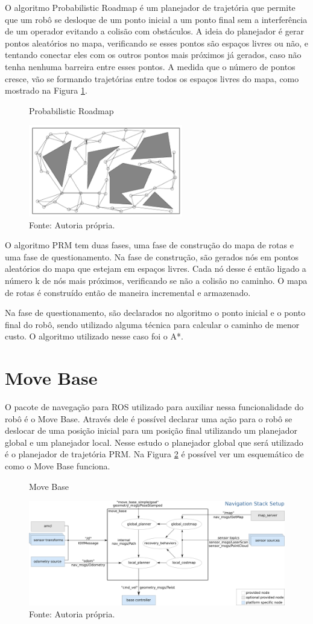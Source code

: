 O algoritmo Probabilistic Roadmap é um planejador de trajetória que permite que um robô se desloque de um ponto inicial a um ponto final sem a interferência de um operador evitando a colisão com obstáculos. A ideia do planejador é gerar pontos aleatórios no mapa, verificando se esses pontos são espaços livres ou não, e tentando conectar eles com os outros pontos mais próximos já gerados, caso não tenha nenhuma barreira entre esses pontos. A medida que o número de pontos cresce, vão se formando trajetórias entre todos os espaços livres do mapa, como mostrado na Figura \ref{fig:prm}. 



\begin{figure} [h!]	
   \centering
   \caption{Probabilistic Roadmap}
   \includegraphics[width=0.6\textwidth]{Figures/images.png}
   \caption*{Fonte: Autoria própria.}
   \label{fig:prm}
\end{figure}

O algoritmo PRM tem duas fases, uma fase de construção do mapa de rotas e uma fase de questionamento. Na fase de construção, são gerados nós em pontos aleatórios do mapa que estejam em espaços livres. Cada nó desse é então ligado a número k de nós mais próximos, verificando se não a colisão no caminho. O mapa de rotas é construído então de maneira incremental e armazenado.

Na fase de questionamento, são declarados no algoritmo o ponto inicial e o ponto final do robô, sendo utilizado alguma técnica para calcular o caminho de menor custo. O algoritmo utilizado nesse caso foi o A*.

\section{Move Base}

O pacote de navegação para ROS utilizado para auxiliar nessa funcionalidade do robô é o Move Base. Através dele é possível declarar uma ação para o robô se deslocar de uma posição inicial para um posição final utilizando um planejador global e um planejador local. Nesse estudo o planejador global que será utilizado é o planejador de trajetória PRM. Na Figura \ref{fig:move} é possível ver um esquemático de como o Move Base funciona.

\begin{figure} [h!]	
   \centering
   \caption{Move Base}
   \includegraphics[width=1\textwidth]{Figures/overview_tf.png}
   \caption*{Fonte: Autoria própria.}
   \label{fig:move}
\end{figure}